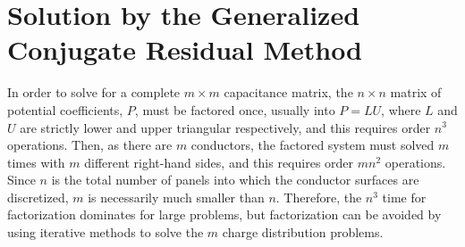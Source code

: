 \section{Solution by the Generalized Conjugate Residual Method}
\label{gcrsec}

In order to solve for a complete $ m\times m $ capacitance matrix, the
$ n\times n $ matrix of potential coefficients, $ P $, must be
factored once, usually into $ P = LU $, where $L$ and $U$ are
strictly lower and upper triangular respectively, and this requires order $
n^3 $ operations.  Then, as there are $ m $ conductors, the factored
system must solved $ m $ times with $ m $ different right-hand sides,
and this requires order $ m n^2 $ operations.  Since $ n $ is the
total number of panels into which the conductor surfaces are discretized, 
$ m $ is necessarily much smaller than $ n $.  Therefore, the $ n^3 $
time for 
factorization dominates for large problems, but factorization
can be avoided by
using iterative methods to solve the $ m $ charge distribution problems.

